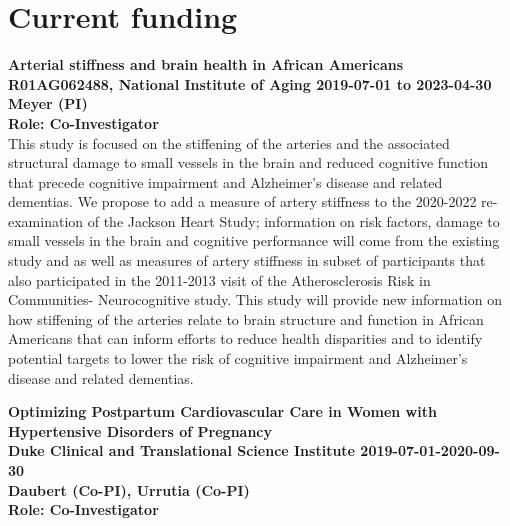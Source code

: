 \documentclass[10pt,letterpaper]{article}
\renewenvironment{itemize}{
  \begin{list}{}{
    \setlength{\leftmargin}{1.5em}
    \setlength{\itemsep}{0.25em}
    \setlength{\parskip}{0pt}
    \setlength{\parsep}{0.25em}
  }
}{
  \end{list}
}
\begin{document}
\section*{Current funding}
\begin{itemize}
    \item \textbf{Arterial stiffness and brain health in African Americans \\ R01AG062488, National Institute of Aging 2019-07-01 to 2023-04-30 \\
    Meyer (PI)\\
    Role: Co-Investigator}\\
    This study is focused on the stiffening of the arteries and the associated structural damage to small vessels in the brain and reduced cognitive function that precede cognitive impairment and Alzheimer's disease and related dementias. We propose to add a measure of artery stiffness to the 2020-2022 re-examination of the Jackson Heart Study; information on risk factors, damage to small vessels in the brain and cognitive performance will come from the existing study and as well as measures of artery stiffness in subset of participants that also participated in the 2011-2013 visit of the Atherosclerosis Risk in Communities- Neurocognitive study. This study will provide new information on how stiffening of the arteries relate to brain structure and function in African Americans that can inform efforts to reduce health disparities and to identify potential targets to lower the risk of cognitive impairment and Alzheimer's disease and related dementias.\\
    
    \item \textbf{Optimizing Postpartum Cardiovascular Care in Women with Hypertensive Disorders of Pregnancy \\ Duke Clinical and Translational Science Institute 2019-07-01-2020-09-30\\  Daubert (Co-PI), Urrutia (Co-PI)\\ 
    Role: Co-Investigator}

\end{itemize}
\end{document}
